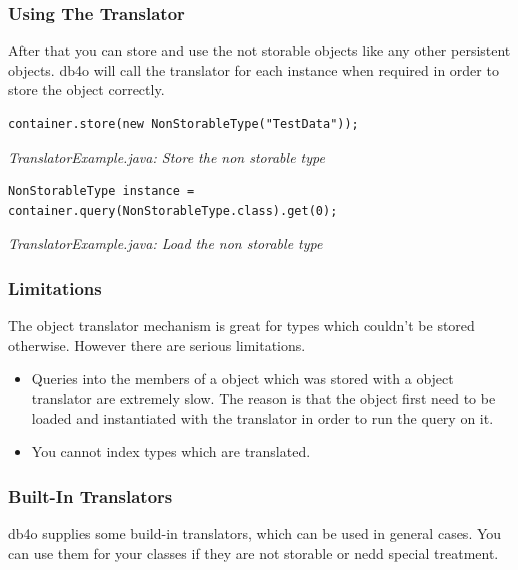 \subsubsection*{Using The Translator}

After that you can store and use the not storable objects like any other persistent objects. db4o will call the translator for each instance when required in order to store the object correctly.

\begin{lstlisting}
container.store(new NonStorableType("TestData"));
\end{lstlisting}

{\small\itshape TranslatorExample.java: Store the non storable type\par}
\medskip

\begin{lstlisting}
NonStorableType instance = container.query(NonStorableType.class).get(0);
\end{lstlisting}

{\small\itshape TranslatorExample.java: Load the non storable type\par}
\medskip

\subsubsection*{Limitations}

The object translator mechanism is great for types which couldn't be stored otherwise. However there are serious limitations.

\begin{itemize}
\item Queries into the members of a object which was stored with a object translator are extremely slow. The reason is that the object first need to be loaded and instantiated with the translator in order to run the query on it.
\item You cannot index types which are translated.
\end{itemize}

\subsubsection{Built-In Translators}
\label{ref:advanced-topics-type-handling-translators-built-in-translators}

db4o supplies some build-in translators, which can be used in general cases. You can use them for your classes if they are not storable or nedd special treatment.


